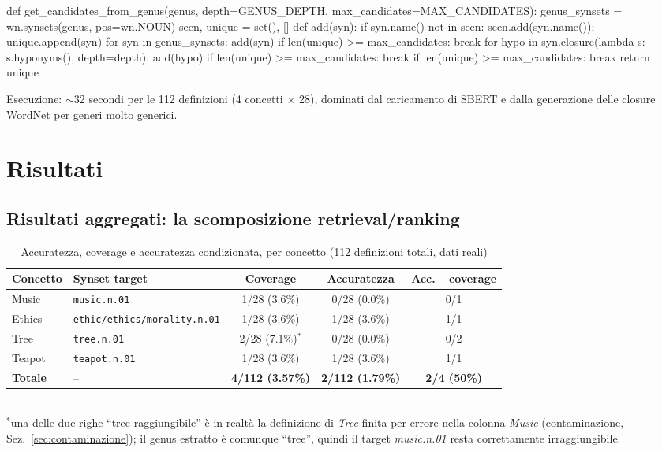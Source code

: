 \documentclass[12pt,a4paper]{article}
\begin{document}
\begin{pylisting}[title={Generazione dei candidati dal genus (con cap e uscita anticipata)}]
def get_candidates_from_genus(genus, depth=GENUS_DEPTH, max_candidates=MAX_CANDIDATES):
    genus_synsets = wn.synsets(genus, pos=wn.NOUN)
    seen, unique = set(), []
    def add(syn):
        if syn.name() not in seen:
            seen.add(syn.name()); unique.append(syn)
    for syn in genus_synsets:
        add(syn)
        if len(unique) >= max_candidates: break
        for hypo in syn.closure(lambda s: s.hyponyms(), depth=depth):
            add(hypo)
            if len(unique) >= max_candidates: break
        if len(unique) >= max_candidates: break
    return unique
\end{pylisting}

Esecuzione: $\sim$32 secondi per le 112 definizioni (4 concetti $\times$ 28), dominati dal caricamento di SBERT e dalla generazione delle closure WordNet per generi molto generici.

\section{Risultati}

\subsection{Risultati aggregati: la scomposizione retrieval/ranking}

\begin{table}[H]
  \centering
  \caption{Accuratezza, coverage e accuratezza condizionata, per concetto (112 definizioni totali, dati reali)}
  \begin{tabular}{llccc}
    \toprule
    \textbf{Concetto} & \textbf{Synset target} & \textbf{Coverage} & \textbf{Accuratezza} & \textbf{Acc.\ $\mid$ coverage} \\
    \midrule
    Music  & \texttt{music.n.01}                              & 1/28 (3.6\%) & 0/28 (0.0\%) & 0/1 \\
    Ethics & \texttt{ethic/ethics/morality.n.01}               & 1/28 (3.6\%) & 1/28 (3.6\%) & 1/1 \\
    Tree   & \texttt{tree.n.01}                                & 2/28 (7.1\%)$^*$ & 0/28 (0.0\%) & 0/2 \\
    Teapot & \texttt{teapot.n.01}                              & 1/28 (3.6\%) & 1/28 (3.6\%) & 1/1 \\
    \midrule
    \textbf{Totale} & -- & \textbf{4/112 (3.57\%)} & \textbf{2/112 (1.79\%)} & \textbf{2/4 (50\%)} \\
    \bottomrule
  \end{tabular}
  \\[0.3em]
  {\footnotesize $^*$una delle due righe ``tree raggiungibile'' \`e in realt\`a la definizione di \textit{Tree} finita per errore nella colonna \textit{Music} (contaminazione, Sez.~\ref{sec:contaminazione}); il genus estratto \`e comunque ``tree'', quindi il target \emph{music.n.01} resta correttamente irraggiungibile.}
\end{table}
\end{document}

